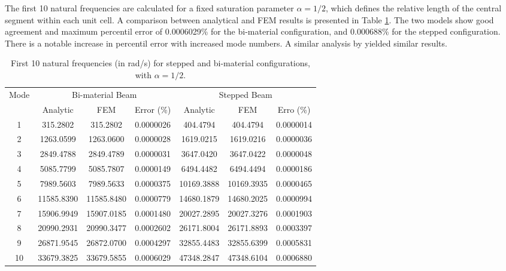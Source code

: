 The first 10 natural frequencies are calculated for a fixed saturation parameter $\alpha=1/2$, which defines the relative length of the central segment within each unit cell. A comparison between analytical and FEM results is presented in Table \ref{tab:sim1}. The two models show good agreement and maximum percentil error of 0.0006029\% for the bi-material configuration, and 0.000688\% for the stepped configuration. There is a notable increase in percentil error with increased mode numbers. A similar analysis by \textcite{Domagalski2021} yielded similar results.
\begin{table}[htbp]
\centering
\caption{First 10 natural frequencies (in rad/s) for stepped and bi-material configurations, with $\alpha=1/2$.}
\label{tab:freq_validation}
\begin{tabular}{c ccc ccc}
\toprule
\multirow{2}{*}{Mode} & \multicolumn{3}{c}{Bi-material Beam} & \multicolumn{3}{c}{Stepped Beam} \\
\cmidrule(lr){2-4} \cmidrule(lr){5-7}
 & Analytic & FEM & Error (\%) & Analytic & FEM & Erro (\%) \\
\midrule
1 & 315.2802 & 315.2802 & 0.0000026 & 404.4794 & 404.4794 & 0.0000014 \\
2 & 1263.0599 & 1263.0600 & 0.0000028 & 1619.0215 & 1619.0216 & 0.0000036 \\
3 & 2849.4788 & 2849.4789 & 0.0000031 & 3647.0420 & 3647.0422 & 0.0000048 \\
4 & 5085.7799 & 5085.7807 & 0.0000149 & 6494.4482 & 6494.4494 & 0.0000186 \\
5 & 7989.5603 & 7989.5633 & 0.0000375 & 10169.3888 & 10169.3935 & 0.0000465 \\
6 & 11585.8390 & 11585.8480 & 0.0000779 & 14680.1879 & 14680.2025 & 0.0000994 \\
7 & 15906.9949 & 15907.0185 & 0.0001480 & 20027.2895 & 20027.3276 & 0.0001903 \\
8 & 20990.2931 & 20990.3477 & 0.0002602 & 26171.8004 & 26171.8893 & 0.0003397 \\
9 & 26871.9545 & 26872.0700 & 0.0004297 & 32855.4483 & 32855.6399 & 0.0005831 \\
10 & 33679.3825 & 33679.5855 & 0.0006029 & 47348.2847 & 47348.6104 & 0.0006880 \\
\bottomrule
\end{tabular}
\label{tab:sim1} 
\end{table}

